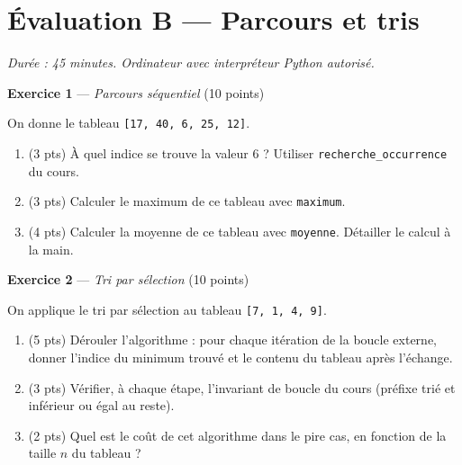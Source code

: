 \section*{Évaluation B --- Parcours et tris}
\textit{Durée : 45 minutes. Ordinateur avec interpréteur Python autorisé.}


\bigskip

\textbf{Exercice 1} --- \textit{Parcours séquentiel} \hfill (10 points)

On donne le tableau \lstinline{[17, 40, 6, 25, 12]}.

\begin{enumerate}
  \item (3 pts) À quel indice se trouve la valeur $6$ ? Utiliser \lstinline{recherche_occurrence} du cours.
  \item (3 pts) Calculer le maximum de ce tableau avec \lstinline{maximum}.
  \item (4 pts) Calculer la moyenne de ce tableau avec \lstinline{moyenne}. Détailler le calcul à la main.
\end{enumerate}


\bigskip

\textbf{Exercice 2} --- \textit{Tri par sélection} \hfill (10 points)

On applique le tri par sélection au tableau \lstinline{[7, 1, 4, 9]}.

\begin{enumerate}
  \item (5 pts) Dérouler l'algorithme : pour chaque itération de la boucle externe, donner l'indice du minimum trouvé et le contenu du tableau après l'échange.
  \item (3 pts) Vérifier, à chaque étape, l'invariant de boucle du cours (préfixe trié et inférieur ou égal au reste).
  \item (2 pts) Quel est le coût de cet algorithme dans le pire cas, en fonction de la taille $n$ du tableau ?
\end{enumerate}


